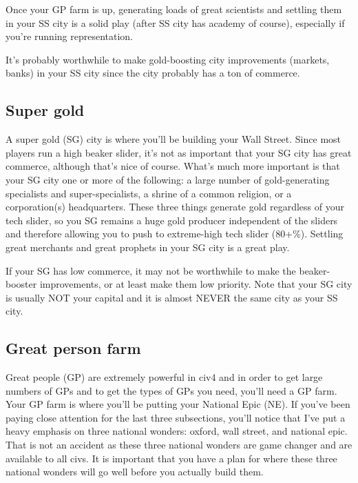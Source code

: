 \documentclass[10pt]{article}
\begin{document}
Once your GP farm is up, generating loads of great scientists and settling
them in your SS city is a solid play (after SS city has academy of course),
especially if you're running representation.

It's probably worthwhile to make gold-boosting city improvements (markets, banks)
in your SS city since the city probably has a ton of commerce.

\subsection*{Super gold}

A super gold (SG) city is where you'll be building your Wall
Street. Since most players run a high beaker slider, it's not as
important that your SG city has great commerce, although that's nice
of course. What's much more important is that your SG city one or more
of the following: a large number of gold-generating specialists and
super-specialists, a shrine of a common religion, or a corporation(s)
headquarters. These three things generate gold regardless of your tech
slider, so you SG remains a huge gold producer independent of the
sliders and therefore allowing you to push to extreme-high tech slider
(80+\%). Settling great merchants and great prophets in your SG city
is a great play.

If your SG has low commerce, it may not be worthwhile to make the
beaker-booster improvements, or at least make them low priority. Note
that your SG city is usually NOT your capital and it is almost NEVER
the same city as your SS city.

\subsection*{Great person farm}

Great people (GP) are extremely powerful in civ4 and in order to get
large numbers of GPs and to get the types of GPs you need, you'll need
a GP farm. Your GP farm is where you'll be putting your National Epic
(NE). If you've been paying close attention for the last three
subsections, you'll notice that I've put a heavy emphasis on three
national wonders: oxford, wall street, and national epic. That is not
an accident as these three national wonders are game changer and are
available to all civs. It is important that you have a plan for where
these three national wonders will go well before you actually build
them.
\end{document}
